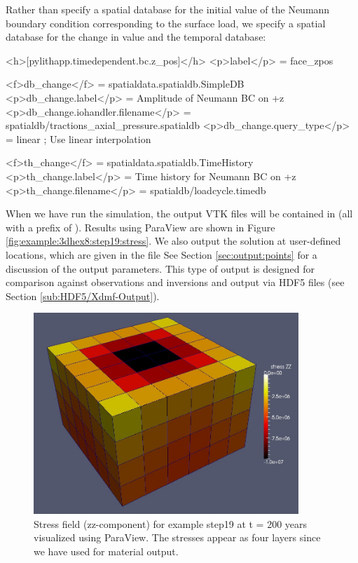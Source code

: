 Rather than specify a spatial database for the initial value of the
Neumann boundary condition corresponding to the surface load, we specify
a spatial database for the change in value and the temporal database:
\begin{cfg}
<h>[pylithapp.timedependent.bc.z_pos]</h>
<p>label</p> = face_zpos

<f>db_change</f> = spatialdata.spatialdb.SimpleDB
<p>db_change.label</p> = Amplitude of Neumann BC on +z
<p>db_change.iohandler.filename</p> = spatialdb/tractions_axial_pressure.spatialdb
<p>db_change.query_type</p> = linear ; Use linear interpolation

<f>th_change</f> = spatialdata.spatialdb.TimeHistory
<p>th_change.label</p> = Time history for Neumann BC on +z
<p>th_change.filename</p> = spatialdb/loadcycle.timedb
\end{cfg}
When we have run the simulation, the output VTK files will be contained
in  (all with a prefix of ).
Results using ParaView are shown in Figure \vref{fig:example:3dhex8:step19:stress}.
We also output the solution at user-defined locations, which are given
in the file  See Section \vref{sec:output:points}
for a discussion of the output parameters. This type of output is
designed for comparison against observations and inversions and output
via HDF5 files (see Section \vref{sub:HDF5/Xdmf-Output}).

\begin{figure}
  \includegraphics[width=10cm]{examples/figs/3dhex8_step19-stress_t200}
  \caption{Stress field (zz-component) for example step19 at t = 200
    years visualized using ParaView. The stresses appear as four
    layers since we have used  for material
    output.}
  \label{fig:example:3dhex8:step19:stress}
\end{figure}


